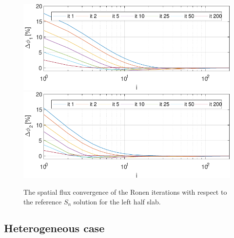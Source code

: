 \begin{figure}[htbp!]
	\centering
	\includegraphics[width=0.45\linewidth]{flux_deviation_half_it_1_sn.pdf}
	\includegraphics[width=0.45\linewidth]{flux_deviation_half_it_2_sn.pdf}
	\caption{The spatial flux convergence of the Ronen iterations with respect to the reference $S_n$ solution for the left half slab.}
	\label{fig:conv3}
\end{figure}


%
\subsection{Heterogeneous case}
\label{subsec:heterog}

